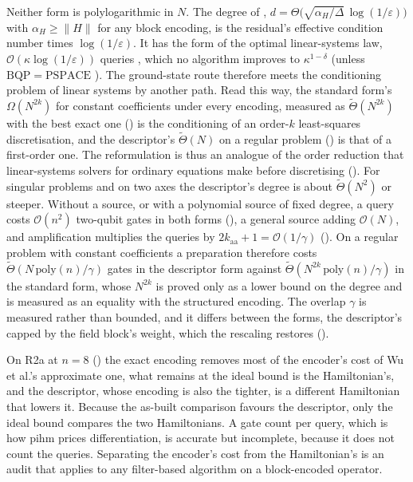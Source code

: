 Neither form is polylogarithmic in $N$. The degree of , $d=\Theta\bigl(\sqrt{\alpha_H/\Delta}\,\log(1/\varepsilon)\bigr)$ with $\alpha_H\ge\|H\|$ for any block encoding, is the residual's effective condition number times $\log(1/\varepsilon)$. It has the form of the optimal linear-systems law, $\mathcal O(\kappa\log(1/\varepsilon))$ queries \cite{costa2022optimal}, which no algorithm improves to $\kappa^{1-\delta}$ (unless $\mathrm{BQP}=\mathrm{PSPACE}$ \cite{harrow2009hhl}). The ground-state route therefore meets the conditioning problem of linear systems by another path. Read this way, the standard form's $\Omega(N^{2k})$ for constant coefficients under every encoding, measured as $\tilde\Theta(N^{2k})$ with the best exact one () is the conditioning of an order-$k$ least-squares discretisation, and the descriptor's $\tilde\Theta(N)$ on a regular problem () is that of a first-order one. The reformulation is thus an analogue of the order reduction that linear-systems solvers for ordinary equations make before discretising (). For singular problems and on two axes the descriptor's degree is about $\tilde\Theta(N^2)$ or steeper. Without a source, or with a polynomial source of fixed degree, a query costs $\mathcal O(n^2)$ two-qubit gates in both forms (), a general source adding $\mathcal O(N)$, and amplification multiplies the queries by $2k_{\mathrm{aa}}+1=\mathcal O(1/\gamma)$ (). On a regular problem with constant coefficients a preparation therefore costs $\tilde\Theta(N\,\mathrm{poly}(n)/\gamma)$ gates in the descriptor form against $\tilde\Theta(N^{2k}\,\mathrm{poly}(n)/\gamma)$ in the standard form, whose $N^{2k}$ is proved only as a lower bound on the degree and is measured as an equality with the structured encoding. The overlap $\gamma$ is measured rather than bounded, and it differs between the forms, the descriptor's capped by the field block's weight, which the rescaling restores ().

On R2a at $n=8$ () the exact encoding removes most of the encoder's cost of Wu et al.'s approximate one, what remains at the ideal bound is the Hamiltonian's, and the descriptor, whose encoding is also the tighter, is a different Hamiltonian that lowers it. Because the as-built comparison favours the descriptor, only the ideal bound compares the two Hamiltonians. A gate count per query, which is how \gls{pihm} prices differentiation, is accurate but incomplete, because it does not count the queries. Separating the encoder's cost from the Hamiltonian's is an audit that applies to any filter-based algorithm on a block-encoded operator.


